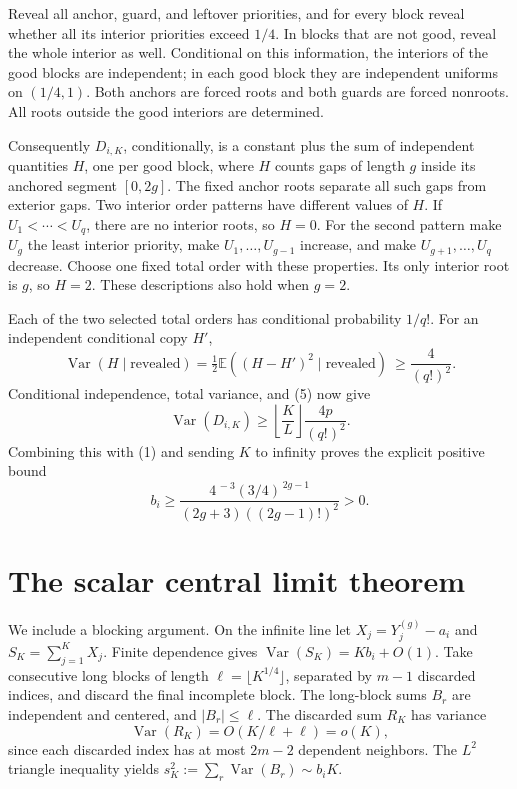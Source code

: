 \documentclass[11pt]{article}
\newcommand{\E}{\mathbb E}
\newcommand{\Var}{\operatorname{Var}}
\begin{document}
Reveal all anchor, guard, and leftover priorities, and for every block
reveal whether all its interior priorities exceed \(1/4\). In blocks
that are not good, reveal the whole interior as well. Conditional on
this information, the interiors of the good blocks are independent;
in each good block they are independent uniforms on \((1/4,1)\).
Both anchors are forced roots and both guards are forced nonroots.
All roots outside the good interiors are determined.

Consequently \(D_{i,K}\), conditionally, is a constant plus the sum
of independent quantities \(H\), one per good block, where \(H\)
counts gaps of length \(g\) inside its anchored segment \([0,2g]\).
The fixed anchor roots separate all such gaps from exterior gaps.
Two interior order patterns have different values of \(H\).
If \(U_1<\cdots<U_q\), there are no interior roots, so \(H=0\).
For the second pattern make \(U_g\) the least interior priority,
make \(U_1,\ldots,U_{g-1}\) increase, and make
\(U_{g+1},\ldots,U_q\) decrease. Choose one fixed total order with these
properties. Its only interior root is \(g\), so \(H=2\).
These descriptions also hold when \(g=2\).

Each of the two selected total orders has conditional probability
\(1/q!\). For an independent conditional copy \(H'\),
\[
 \Var(H\mid\text{revealed})
 =\tfrac12\E((H-H')^2\mid\text{revealed})
 \ \geq\frac4{(q!)^2}.                                     \tag{6}
\]
Conditional independence, total variance, and (5) now give
\[
 \Var(D_{i,K})\geq
 \left\lfloor\frac K L\right\rfloor
                  \frac{4p}{(q!)^2}.
\]
Combining this with (1) and sending \(K\) to infinity proves the explicit
positive bound
\[
 b_i\geq \frac{4^{\, -3}(3/4)^{\,2g-1}}
                    {(2g+3)((2g-1)!)^2}>0.                 \tag{7}
\]

\section*{The scalar central limit theorem}
We include a blocking argument. On the infinite line let
\(X_j=Y_j^{(g)}-a_i\) and \(S_K=\sum_{j=1}^K X_j\).
Finite dependence gives
\(\Var(S_K)=Kb_i+O(1)\). Take consecutive long blocks of length
\(\ell=\lfloor K^{1/4}\rfloor\), separated by \(m-1\) discarded
indices, and discard the final incomplete block. The long-block sums
\(B_r\) are independent and centered, and \(|B_r|\leq\ell\).
The discarded sum \(R_K\) has variance
\[
 \Var(R_K)=O(K/\ell+\ell)=o(K),
\]
since each discarded index has at most \(2m-2\) dependent neighbors.
The \(L^2\) triangle inequality yields
\(s_K^2:=\sum_r\Var(B_r)\sim b_iK\).
\end{document}
